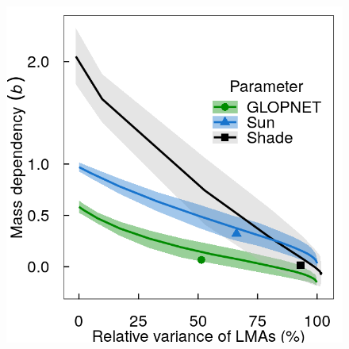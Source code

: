 \documentclass[
  12pt,
  a4paper,
,tablecaptionabove
]{scrartcl}
\providecommand{\DIFaddbeginFL}{} %
\providecommand{\DIFdelbeginFL}{} %
\providecommand{\DIFdelendFL}{} %
\newcommand{\DIFscaledelfig}{0.5}
\newlength{\DIFdelgraphicswidth} %
\newlength{\DIFdelgraphicsheight} %
\newcommand{\DIFaddincludegraphics}[2][]{{\color{blue}\fbox{\DIFOincludegraphics[#1]{#2}}}} %
\newcommand{\DIFdelincludegraphics}[2][]{%
\sbox{\DIFdelgraphicsbox}{\DIFOincludegraphics[#1]{#2}}%
\settoboxwidth{\DIFdelgraphicswidth}{\DIFdelgraphicsbox} %
\settoboxtotalheight{\DIFdelgraphicsheight}{\DIFdelgraphicsbox} %
\scalebox{\DIFscaledelfig}{%
\parbox[b]{\DIFdelgraphicswidth}{\usebox{\DIFdelgraphicsbox}\\[-\baselineskip] \rule{\DIFdelgraphicswidth}{0em}}\llap{\resizebox{\DIFdelgraphicswidth}{\DIFdelgraphicsheight}{%
\setlength{\unitlength}{\DIFdelgraphicswidth}%
\begin{picture}(1,1)%
\thicklines\linethickness{2pt} %
{\color[rgb]{1,0,0}\put(0,0){\framebox(1,1){}}}%
{\color[rgb]{1,0,0}\put(0,0){\line( 1,1){1}}}%
{\color[rgb]{1,0,0}\put(0,1){\line(1,-1){1}}}%
\end{picture}%
}\hspace*{3pt}}} %
} %
\DeclareRobustCommand{\DIFaddbeginFL}{\DIFOaddbeginFL \let\includegraphics\DIFaddincludegraphics} %
\DeclareRobustCommand{\DIFdelbeginFL}{\DIFOdelbeginFL \let\includegraphics\DIFdelincludegraphics} %
\DeclareRobustCommand{\DIFdelendFL}{\DIFOaddendFL \let\includegraphics\DIFOincludegraphics} %
\begin{document}
\begin{figure}
\DIFdelbeginFL %
\DIFdelendFL \DIFaddbeginFL 

{\centering \includegraphics{../figs/mass_prop_mv.png}

}


\end{figure}
\end{document}

